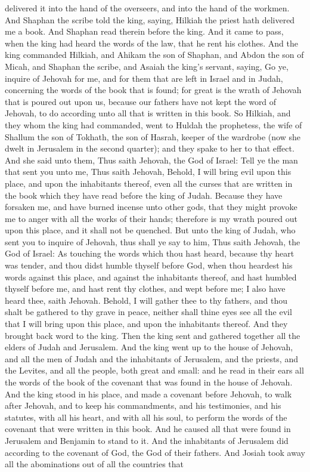 delivered it into the hand of the overseers, and into the hand of the workmen. And Shaphan the scribe told the king, saying, Hilkiah the priest hath delivered me a book. And Shaphan read therein before the king. And it came to pass, when the king had heard the words of the law, that he rent his clothes. And the king commanded Hilkiah, and Ahikam the son of Shaphan, and Abdon the son of Micah, and Shaphan the scribe, and Asaiah the king’s servant, saying, Go ye, inquire of Jehovah for me, and for them that are left in Israel and in Judah, concerning the words of the book that is found; for great is the wrath of Jehovah that is poured out upon us, because our fathers have not kept the word of Jehovah, to do according unto all that is written in this book.  So Hilkiah, and they whom the king had commanded, went to Huldah the prophetess, the wife of Shallum the son of Tokhath, the son of Hasrah, keeper of the wardrobe (now she dwelt in Jerusalem in the second quarter); and they spake to her to that effect. And she said unto them, Thus saith Jehovah, the God of Israel: Tell ye the man that sent you unto me, Thus saith Jehovah, Behold, I will bring evil upon this place, and upon the inhabitants thereof, even all the curses that are written in the book which they have read before the king of Judah. Because they have forsaken me, and have burned incense unto other gods, that they might provoke me to anger with all the works of their hands; therefore is my wrath poured out upon this place, and it shall not be quenched. But unto the king of Judah, who sent you to inquire of Jehovah, thus shall ye say to him, Thus saith Jehovah, the God of Israel: As touching the words which thou hast heard, because thy heart was tender, and thou didst humble thyself before God, when thou heardest his words against this place, and against the inhabitants thereof, and hast humbled thyself before me, and hast rent thy clothes, and wept before me; I also have heard thee, saith Jehovah. Behold, I will gather thee to thy fathers, and thou shalt be gathered to thy grave in peace, neither shall thine eyes see all the evil that I will bring upon this place, and upon the inhabitants thereof. And they brought back word to the king.  Then the king sent and gathered together all the elders of Judah and Jerusalem. And the king went up to the house of Jehovah, and all the men of Judah and the inhabitants of Jerusalem, and the priests, and the Levites, and all the people, both great and small: and he read in their ears all the words of the book of the covenant that was found in the house of Jehovah. And the king stood in his place, and made a covenant before Jehovah, to walk after Jehovah, and to keep his commandments, and his testimonies, and his statutes, with all his heart, and with all his soul, to perform the words of the covenant that were written in this book. And he caused all that were found in Jerusalem and Benjamin to stand to it. And the inhabitants of Jerusalem did according to the covenant of God, the God of their fathers. And Josiah took away all the abominations out of all the countries that 